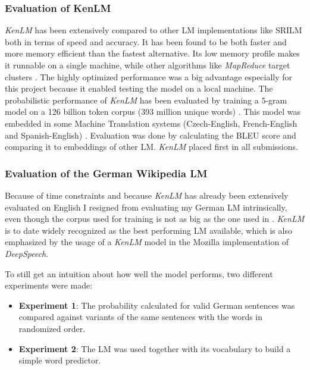 \subsubsection{Evaluation of KenLM}

\textit{KenLM} has been extensively compared to other \ac{LM} implementations like \ac{SRILM} both in terms of speed and accuracy. It has been found to be both faster and more memory efficient \parencite{kenlm} than the fastest alternative. Its low memory profile makes it runnable on a single machine, while other algorithms like \textit{MapReduce} target clusters \parencite{kenlm_estimation}. The highly optimized performance was a big advantage especially for this project because it enabled testing the model on a local machine. The probabilistic performance of \textit{KenLM} has been evaluated by training a $5$-gram model on a 126 billion token corpus (393 million unique words) \parencite{kenlm_estimation}. This model was embedded in some Machine Translation systems (Czech-English, French-English and Spanish-English) . Evaluation was done by calculating the BLEU score and comparing it to embeddings of other \ac{LM}. \textit{KenLM} placed first in all submissions.

\subsubsection{Evaluation of the German Wikipedia \ac{LM}}

Because of time constraints and because \textit{KenLM} has already been extensively evaluated on English I resigned from evaluating my German \ac{LM} intrinsically, even though the corpus used for training is not as big as the one used in \cite{kenlm_estimation}. \textit{KenLM} is to date widely recognized as the best performing \ac{LM} available, which is also emphasized by the usage of a \textit{KenLM} model in the Mozilla implementation of \textit{DeepSpeech}.

To still get an intuition about how well the model performs, two different experiments were made:

\begin{itemize}
	\item \textbf{Experiment 1}: The probability calculated for valid German sentences was compared against variants of the same sentences with the words in randomized order.
	\item \textbf{Experiment 2}: The \ac{LM} was used together with its vocabulary to build a simple word predictor.
\end{itemize}

